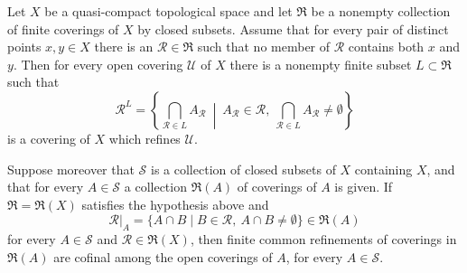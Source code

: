 \begin{lemma}
\label{lemma-separating-finite-closed-coverings-refine-open-covering}
\begin{reference}
\cite[Chapter III, \S 3.9, Proposition 3.9.2,
pp. 180--181]{Tohoku}
\end{reference}
Let $X$ be a quasi-compact topological space and let $\mathfrak R$ be a
nonempty collection of finite coverings of $X$ by closed subsets. Assume
that for every pair of distinct points $x, y \in X$ there is an
$\mathcal R \in \mathfrak R$ such that no member of $\mathcal R$ contains
both $x$ and $y$. Then for every open covering $\mathcal U$ of $X$ there
is a nonempty finite subset $L \subset \mathfrak R$ such that
$$
\mathcal R^L =
\left\{\bigcap_{\mathcal R \in L} A_{\mathcal R} \ \middle|\
A_{\mathcal R} \in \mathcal R,\
\bigcap_{\mathcal R \in L} A_{\mathcal R} \neq \emptyset\right\}
$$
is a covering of $X$ which refines $\mathcal U$.

Suppose moreover that $\mathcal S$ is a collection of closed subsets of
$X$ containing $X$, and that for every $A \in \mathcal S$ a collection
$\mathfrak R(A)$ of coverings of $A$ is given. If
$\mathfrak R = \mathfrak R(X)$ satisfies the hypothesis above and
$$
\mathcal R|_A =
\{A \cap B \mid B \in \mathcal R,\ A \cap B \neq \emptyset\}
\in \mathfrak R(A)
$$
for every $A \in \mathcal S$ and $\mathcal R \in \mathfrak R(X)$, then
finite common refinements of coverings in $\mathfrak R(A)$ are cofinal
among the open coverings of $A$, for every $A \in \mathcal S$.
\end{lemma}

